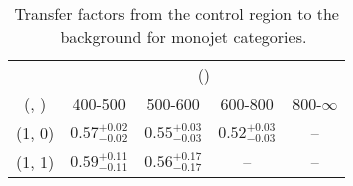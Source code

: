 \begin{table}[h!]
\tiny
\centering
\caption{Transfer factors from the \gj control region to the \zInv~ background for monojet categories.\label{tab:tf_gj_zinv_mono}}
\begin{tabular}
{ccccc}
	\hline\hline
	& \multicolumn{4}{c}{\scalht (\gev)} \\ 
	 (\njet,  \nb) & 400-500 & 500-600 & 600-800 & 800-$\infty$ \\ [0.8ex] 
\hline
	(1, 0) & $0.57^{+ 0.02 }_{- 0.02 }$ & $0.55^{+ 0.03 }_{- 0.03 }$ & $0.52^{+ 0.03 }_{- 0.03 }$ & -- \\[0.5ex] 
	(1, 1) & $0.59^{+ 0.11 }_{- 0.11 }$ & $0.56^{+ 0.17 }_{- 0.17 }$ & -- & -- \\[0.5ex] 
	\hline
	\hline
\end{tabular}
\end{table}
